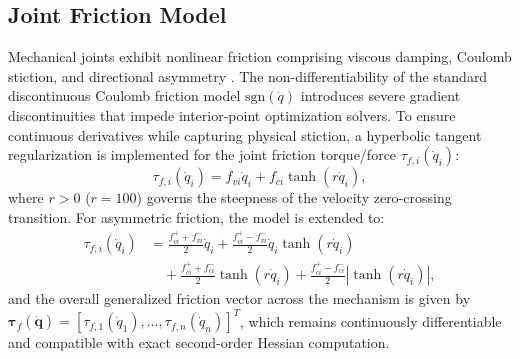 \documentclass[lettersize,journal]{IEEEtran}
\begin{document}
\subsection{Joint Friction Model}
Mechanical joints exhibit nonlinear friction comprising viscous damping, Coulomb stiction, and directional asymmetry \cite{AguilarSierra2014}. The non-differentiability of the standard discontinuous Coulomb friction model $\text{sgn}(\dot{q})$ introduces severe gradient discontinuities that impede interior-point optimization solvers. To ensure continuous derivatives while capturing physical stiction, a hyperbolic tangent regularization is implemented for the joint friction torque/force $\tau_{f,i}(\dot{q}_i)$:
\begin{equation}
    \tau_{f,i}(\dot{q}_i) = f_{vi} \dot{q}_i + f_{ci} \tanh(r \dot{q}_i),
    \label{eq:fric_sym}
\end{equation}
where $r > 0$ ($r = 100$) governs the steepness of the velocity zero-crossing transition. For asymmetric friction, the model is extended to:
\begin{align}
    \tau_{f,i}(\dot{q}_i) &= \frac{f_{vi}^+ + f_{vi}^-}{2} \dot{q}_i + \frac{f_{vi}^+ - f_{vi}^-}{2} \dot{q}_i \tanh(r \dot{q}_i) \nonumber \\
    &\quad + \frac{f_{ci}^+ + f_{ci}^-}{2} \tanh(r \dot{q}_i) + \frac{f_{ci}^+ - f_{ci}^-}{2} |\tanh(r \dot{q}_i)|,
    \label{eq:fric_asym}
\end{align}
and the overall generalized friction vector across the mechanism is given by $\bm{\tau}_f(\dot{\bm{q}}) = [\tau_{f,1}(\dot{q}_1), \dots, \tau_{f,n}(\dot{q}_n)]^T$, which remains continuously differentiable and compatible with exact second-order Hessian computation.
\end{document}
